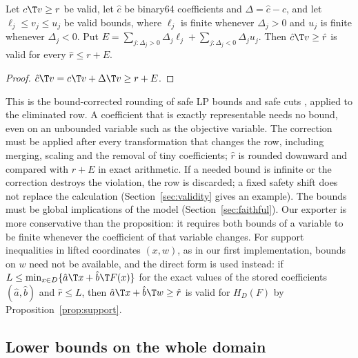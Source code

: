 \begin{proposition}\label{prop:export}
Let $c\T v\ge r$ be valid, let $\hat c$ be binary64 coefficients and
$\Delta=\hat c-c$, and let $\ell_j\le v_j\le u_j$ be valid bounds, where
$\ell_j$ is finite whenever $\Delta_j>0$ and $u_j$ is finite whenever
$\Delta_j<0$. Put
$E=\sum_{j:\Delta_j>0}\Delta_j\ell_j+\sum_{j:\Delta_j<0}\Delta_ju_j$. Then
$\hat c\T v\ge\hat r$ is valid for every $\hat r\le r+E$.
\end{proposition}

\begin{proof}
$\hat c\T v=c\T v+\Delta\T v\ge r+E$.
\end{proof}

This is the bound-corrected rounding of safe LP bounds and safe cuts
\citep{NeumaierShcherbina2004,CookEtAl2009SafeCuts,EiflerGleixner2024},
applied to the eliminated row. A coefficient that is exactly representable
needs no bound, even on an unbounded variable such as the objective variable.
The correction must be applied after every transformation that changes the
row, including merging, scaling and the removal of tiny coefficients; $\hat r$
is rounded downward and compared with $r+E$ in exact arithmetic. If a needed
bound is infinite or the correction destroys the violation, the row is
discarded; a fixed safety shift does not replace the calculation
(Section~\ref{sec:validity} gives an example). The bounds
must be global implications of the model (Section~\ref{sec:faithful}). Our
exporter is more conservative than the proposition: it requires both bounds
of a variable to be finite whenever the coefficient of that variable changes.
For support inequalities in lifted coordinates $(x,w)$, as in our first
implementation, bounds on $w$ need not be available, and the direct form is
used instead: if $L\le\min_{x\in D}\{\hat a\T x+\hat b\T F(x)\}$ for the exact
values of the stored coefficients $(\hat a,\hat b)$ and $\hat r\le L$, then
$\hat a\T x+\hat b\T w\ge\hat r$ is valid for $H_D(F)$ by
Proposition~\ref{prop:support}.

\subsection{Lower bounds on the whole domain}\label{sec:bounds}

